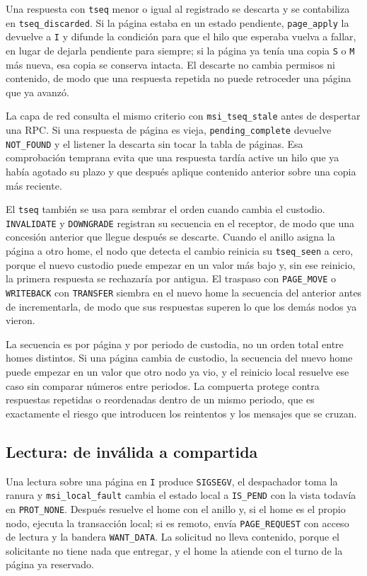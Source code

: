 Una respuesta con \texttt{tseq} menor o igual al registrado se descarta y se contabiliza en \texttt{tseq\_discarded}. Si la página estaba en un estado pendiente, \texttt{page\_apply} la devuelve a \texttt{I} y difunde la condición para que el hilo que esperaba vuelva a fallar, en lugar de dejarla pendiente para siempre; si la página ya tenía una copia \texttt{S} o \texttt{M} más nueva, esa copia se conserva intacta. El descarte no cambia permisos ni contenido, de modo que una respuesta repetida no puede retroceder una página que ya avanzó.

La capa de red consulta el mismo criterio con \texttt{msi\_tseq\_stale} antes de despertar una RPC. Si una respuesta de página es vieja, \texttt{pending\_complete} devuelve \texttt{NOT\_FOUND} y el listener la descarta sin tocar la tabla de páginas. Esa comprobación temprana evita que una respuesta tardía active un hilo que ya había agotado su plazo y que después aplique contenido anterior sobre una copia más reciente.

El \texttt{tseq} también se usa para sembrar el orden cuando cambia el custodio. \texttt{INVALIDATE} y \texttt{DOWNGRADE} registran su secuencia en el receptor, de modo que una concesión anterior que llegue después se descarte. Cuando el anillo asigna la página a otro home, el nodo que detecta el cambio reinicia su \texttt{tseq\_seen} a cero, porque el nuevo custodio puede empezar en un valor más bajo y, sin ese reinicio, la primera respuesta se rechazaría por antigua. El traspaso con \texttt{PAGE\_MOVE} o \texttt{WRITEBACK} con \texttt{TRANSFER} siembra en el nuevo home la secuencia del anterior antes de incrementarla, de modo que sus respuestas superen lo que los demás nodos ya vieron.

La secuencia es por página y por periodo de custodia, no un orden total entre homes distintos. Si una página cambia de custodio, la secuencia del nuevo home puede empezar en un valor que otro nodo ya vio, y el reinicio local resuelve ese caso sin comparar números entre periodos. La compuerta protege contra respuestas repetidas o reordenadas dentro de un mismo periodo, que es exactamente el riesgo que introducen los reintentos y los mensajes que se cruzan.

\subsection{Lectura: de inválida a compartida}\label{sec:msi-lectura}

Una lectura sobre una página en \texttt{I} produce \texttt{SIGSEGV}, el despachador toma la ranura y \texttt{msi\_local\_fault} cambia el estado local a \texttt{IS\_PEND} con la vista todavía en \texttt{PROT\_NONE}. Después resuelve el home con el anillo y, si el home es el propio nodo, ejecuta la transacción local; si es remoto, envía \texttt{PAGE\_REQUEST} con acceso de lectura y la bandera \texttt{WANT\_DATA}. La solicitud no lleva contenido, porque el solicitante no tiene nada que entregar, y el home la atiende con el turno de la página ya reservado.

